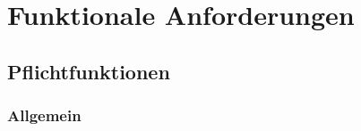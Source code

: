 \chapter{Funktionale Anforderungen}
\label{ch:funktionen}


\setcounter{fanr}{10}
\newcommand{\fano}[1]{\subsubsection{#1}\addtocounter{fanr}{10}}
\newcommand{\subfano}[1]{\subsubsection{#1}\addtocounter{fanr}{1}}
\renewcommand\thesubsubsection{/FA\ifnum\value{fanr}<10 00\else\ifnum\value{fanr}<100 0\fi\fi\arabic{fanr}/}

\section{Pflichtfunktionen}

\subsection{Allgemein}

